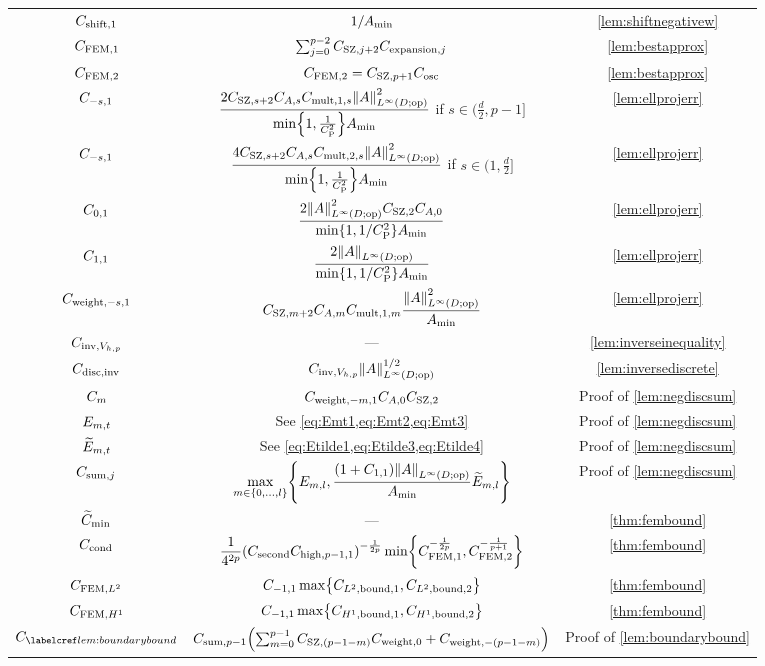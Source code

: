 \begin{longtabu}{ccc}
            $C_{\mathrm{shift},1}$ &$1/A_{\min}$& \cref{lem:shiftnegativew}\\
  $C_{\mathrm{FEM},1}$ & $\sum_{j=0}^{p-2}C_{\mathrm{SZ},j+2}C_{\mathrm{expansion},j} $ & \cref{lem:bestapprox}\\
  $C_{\mathrm{FEM},2}$ & $C_{\mathrm{FEM},2} = C_{\mathrm{SZ},p+1}C_{\mathrm{osc}}$ & \cref{lem:bestapprox}\\
  $C_{-s,1}$ &$\displaystyle\frac{2\CSZfn{s+2}\CAfn{s}\CBanfn{s}\NLiDop{A}^2}{\min\set{1,\frac1{\CP^2}}\Amin}$ if $s \in (\frac{d}2,p-1]$& \cref{lem:ellprojerr} \\
  $C_{-s,1}$ &$\displaystyle\frac{4\CSZfn{s+2}\CAfn{s}\Cprod{s}\NLiDop{A}^2}{\min\set{1,\frac1{\CP^2}}\Amin}$ if $s \in (1,\frac{d}2]$& \cref{lem:ellprojerr} \\
  $C_{0,1}$ &$\displaystyle\frac{2\NLiDop{A}^2\CSZfn{2}\CAfn{0}}{\min\set{1,1/\CP^2}\Amin}$& \cref{lem:ellprojerr} \\
    $C_{1,1}$ &$\displaystyle\frac{2\NLiDop{A}}{\min\set{1,1/\CP^2}\Amin}$& \cref{lem:ellprojerr} \\
  $C_{\mathrm{weight},-s,1}$ &$\displaystyle\CSZfn{m+2}\CAfn{m}\CBanfn{m}\frac{\NLiDop{A}^2}{\Amin}$& \cref{lem:ellprojerr} \\
  $C_{\mathrm{inv},V_{h,p}}$ &---& \cref{lem:inverseinequality}\\
  $C_{\mathrm{disc},\mathrm{inv}}$ & $\CinvVhp \NLiDop{A}^{1/2}$ & \cref{lem:inversediscrete}\\
  $C_{m}$ & $C_{\mathrm{weight},-m,1}  C_{A,0} C_{\mathrm{SZ},2}$ & Proof of \cref{lem:negdiscsum}\\
  $E_{m,t}$ & See \cref{eq:Emt1,eq:Emt2,eq:Emt3} & Proof of \cref{lem:negdiscsum}\\
  $\widetilde{E}_{m,t}$ & See \cref{eq:Etilde1,eq:Etilde3,eq:Etilde4} & Proof of \cref{lem:negdiscsum}\\
  $C_{\mathrm{sum},j}$ &$\displaystyle\max_{m \in \set{0,\ldots,l}}\set{\Efn{m,l},\frac{\mleft(1+\Cfn{1,1}\mright)\NLiDop{A}}{\Amin}\Etildefn{m,l}}$ & Proof of \cref{lem:negdiscsum}\\
  $\widetilde{C}_{\min}$&---&\cref{thm:fembound}\\
  $C_{\mathrm{cond}}$ & $\displaystyle\frac1{4^{2p}} \mleft(\Csecond\Chighfn{p-1,1}\mright)^{-\frac1{2p}} \min\set{\CFEMo^{-\frac1{2p}},\CFEMt^{-\frac1{p+1}}}$ & \cref{thm:fembound}\\
  $C_{\mathrm{FEM},L^{2}}$ &$\Cfn{-1,1} \max\set{\CLtboundo,\CLtboundt}$&\cref{thm:fembound}\\
  $C_{\mathrm{FEM},H^{1}}$ &$\Cfn{-1,1}\max\set{\CHoboundo,\CHoboundt}$&\cref{thm:fembound}\\
  $\Cmess$ &$\Csumpmo \mleft(\sum_{m=0}^{p-1} \CSZfn{(p-1-m)} \Cwfn{0} + \Cwfn{-(p-1-m)}\mright)$&Proof of \cref{lem:boundarybound}\\

\end{longtabu}
